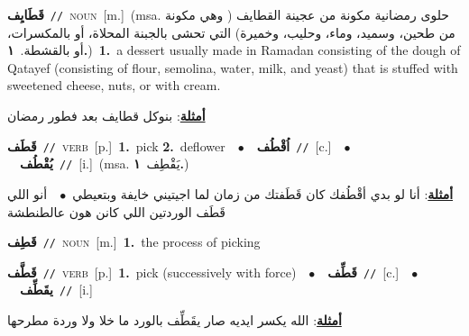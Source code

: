 \documentclass[10pt,a4paper,twoside]{article} %
\begin{document}
\begin{multicols}{2}
{\setlength\topsep{0pt}\textbf{\foreignlanguage{arabic}{قَطَايِف}}\ {\color{gray}\texttt{//}\color{black}}\ \textsc{noun}\ [m.]\ \color{gray}(msa. \foreignlanguage{arabic}{حلوى رمضانية مكونة من عجينة القطايف ( وهي مكونة من طحين، وسميد، وماء، وحليب، وخميرة) التي تحشى بالجبنة المحلاة، أو بالمكسرات، أو بالقشطة.}~\foreignlanguage{arabic}{\textbf{١.}})\color{black}\ \textbf{1.}~a dessert usually made in Ramadan consisting of the dough of Qatayef (consisting of flour, semolina, water, milk, and yeast) that is stuffed with sweetened cheese, nuts, or with cream.\  \begin{flushright}\color{gray}\foreignlanguage{arabic}{\textbf{\underline{\foreignlanguage{arabic}{أمثلة}}}: بنوكل قطايف بعد فطور رمضان}\end{flushright}\color{black}} \vspace{2mm}

{\setlength\topsep{0pt}\textbf{\foreignlanguage{arabic}{قَطَف}}\ {\color{gray}\texttt{//}\color{black}}\ \textsc{verb}\ [p.]\ \textbf{1.}~pick  \textbf{2.}~deflower\ \ $\bullet$\ \ \setlength\topsep{0pt}\textbf{\foreignlanguage{arabic}{اُقْطُف}}\ {\color{gray}\texttt{//}\color{black}}\ [c.]\ \ $\bullet$\ \ \setlength\topsep{0pt}\textbf{\foreignlanguage{arabic}{يُقْطُف}}\ {\color{gray}\texttt{//}\color{black}}\ [i.]\ \color{gray}(msa. \foreignlanguage{arabic}{يَقْطِف}~\foreignlanguage{arabic}{\textbf{١.}})\color{black}\  \begin{flushright}\color{gray}\foreignlanguage{arabic}{\textbf{\underline{\foreignlanguage{arabic}{أمثلة}}}: أنا لو بدي أقْطُفك كان قَطَفتك من زمان لما اجيتيني خايفة وبتعيطي\ $\bullet$\ \  أنو اللي قَطَف الوردتين اللي كانن هون عالطنطشة}\end{flushright}\color{black}} \vspace{2mm}

{\setlength\topsep{0pt}\textbf{\foreignlanguage{arabic}{قَطِف}}\ {\color{gray}\texttt{//}\color{black}}\ \textsc{noun}\ [m.]\ \textbf{1.}~the process of picking\ } \vspace{2mm}

{\setlength\topsep{0pt}\textbf{\foreignlanguage{arabic}{قَطَّف}}\ {\color{gray}\texttt{//}\color{black}}\ \textsc{verb}\ [p.]\ \textbf{1.}~pick (successively with force)\ \ $\bullet$\ \ \setlength\topsep{0pt}\textbf{\foreignlanguage{arabic}{قَطِّف}}\ {\color{gray}\texttt{//}\color{black}}\ [c.]\ \ $\bullet$\ \ \setlength\topsep{0pt}\textbf{\foreignlanguage{arabic}{يقَطِّف}}\ {\color{gray}\texttt{//}\color{black}}\ [i.]\  \begin{flushright}\color{gray}\foreignlanguage{arabic}{\textbf{\underline{\foreignlanguage{arabic}{أمثلة}}}: الله يكسر ايديه صار يقَطِّف بالورد ما خلا ولا وردة مطرحها}\end{flushright}\color{black}} \vspace{2mm}


\end{multicols}
\end{document}
